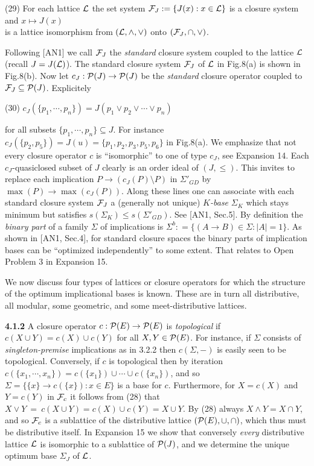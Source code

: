 \documentclass[11pt]{article}
\newcommand{\ra}{\rightarrow}
\begin{document}
(29) \quad For each lattice ${\cal L}$ the set system ${\cal F}_J: = \{J(x): x \in {\cal L}\}$ is a closure system and $x \mapsto J(x)$\\
\hspace*{1cm} is a lattice isomorphism from $({\cal L},\wedge, \vee)$ onto $({\cal F}_J, \cap, \vee)$.

Following [AN1] we call ${\cal F}_J$ the {\it standard} closure system coupled to the lattice ${\cal L}$ (recall $J = J({\cal L})$). The standard closure system ${\cal F}_J$ of ${\cal L}$ in Fig.8(a) is shown in Fig.8(b). Now let $c_J: {\cal P}(J) \ra {\cal P}(J)$ be the {\it standard} closure operator coupled to ${\cal F}_J \subseteq {\cal P}(J)$. Explicitely

(30) \quad $c_J(\{ p_1, \cdots, p_n\}) = J(p_1 \vee p_2 \vee \cdots \vee p_n)$

for all subsets $\{p_1, \cdots, p_n\} \subseteq J$.  For instance $c_J(\{p_2, p_5\}) = J(u) = \{p_1, p_2, p_3, p_5, p_6\}$ in Fig.8(a). 
We emphasize that not every closure operator $c$ is ``isomorphic'' to one of type $c_J$, see Expansion 14. Each $c_J$-quasiclosed subset of $J$ clearly is an order ideal of $(J, \leq)$.  This invites to replace each implication $P \ra (c_J (P) \setminus P)$ in $\Sigma'_{GD}$ by $\max (P) \ra \max (c_J(P))$. Along these lines one can associate with each standard closure system ${\cal F}_J$ a (generally not unique) {\it $K$-base} $\Sigma_K$ which stays minimum but satisfies $s(\Sigma_K) \leq s (\Sigma'_{GD})$. See [AN1, Sec.5]. By definition the {\it binary part} of a family $\Sigma$ of implications is $\Sigma^b: = \{(A \ra B) \in \Sigma : |A| = 1\}$. As shown in [AN1, Sec.4], for standard closure spaces the binary parts of implication bases can be ``optimized independently'' to some extent. That relates to Open Problem 3 in Expansion 15.


We now discuss four types of lattices or closure operators for which the structure of the optimum implicational bases is known. These are in turn 
all distributive, all modular, some geometric, and some meet-distributive lattices.

{\bf 4.1.2} A closure operator $c: {\cal P}(E) \ra {\cal P}(E)$ is {\it topological} if $c(X \cup Y) = c(X) \cup c(Y)$ for all $X, Y \in {\cal P}(E)$. For instance, if $\Sigma$ consists of {\it singleton-premise} implications as in 3.2.2 then $c(\Sigma, -)$ is easily seen to be topological. Conversely, if $c$ is topological then by iteration $c(\{x_1, \cdots, x_n\}) = c(\{x_1 \}) \cup \cdots \cup c(\{x_n\})$, and so $\Sigma = \{\{x\} \ra c(\{x\}): x \in E\}$ is a
base for $c$.
Furthermore, for $X = c(X)$ and $Y = c(Y)$ in ${\cal F}_c$ it follows from (28) that
$X \vee Y \  = \  c (X \cup Y) = c(X) \cup c(Y) = X \cup Y.$
By (28) always $X \wedge Y = X \cap Y$, and so ${\cal F}_c$ is a sublattice of the distributive lattice $({\cal P}(E), \cup, \cap)$, which thus must be distributive itself. 
In Expansion 15 we show that conversely {\it every} distributive lattice ${\cal L}$ is isomorphic to a sublattice of ${\cal P}(J)$, and we determine the unique optimum base $\Sigma_J$ of ${\cal L}$.
\end{document}
